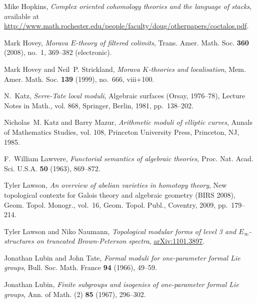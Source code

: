 \documentclass{gtpart}
\theoremstyle{definition}
\theoremstyle{remark}
\begin{document}
\begin{thebibliography}
Mike Hopkins, \emph{Complex oriented cohomology theories and the language of
  stacks}, available at
  \href{http://www.math.rochester.edu/people/faculty/doug/otherpapers/coctalos.pdf}{http://www.math.rochester.edu/people/faculty/doug/otherpapers/coctalos.pdf}.

Mark Hovey, \emph{Morava {$E$}-theory of filtered colimits}, Trans. Amer. Math.
  Soc. \textbf{360} (2008), no.~1, 369--382 (electronic). 

Mark Hovey and Neil~P. Strickland, \emph{Morava {$K$}-theories and
  localisation}, Mem. Amer. Math. Soc. \textbf{139} (1999), no.~666, viii+100.

N.~Katz, \emph{Serre-{T}ate local moduli}, Algebraic surfaces ({O}rsay,
  1976--78), Lecture Notes in Math., vol. 868, Springer, Berlin, 1981,
  pp.~138--202. 

Nicholas~M. Katz and Barry Mazur, \emph{Arithmetic moduli of elliptic curves},
  Annals of Mathematics Studies, vol. 108, Princeton University Press,
  Princeton, NJ, 1985. 

F.~William Lawvere, \emph{Functorial semantics of algebraic theories}, Proc.
  Nat. Acad. Sci. U.S.A. \textbf{50} (1963), 869--872. 

Tyler Lawson, \emph{An overview of abelian varieties in homotopy theory}, New
  topological contexts for {G}alois theory and algebraic geometry ({BIRS}
  2008), Geom. Topol. Monogr., vol.~16, Geom. Topol. Publ., Coventry, 2009,
  pp.~179--214. 

Tyler Lawson and Niko Naumann, \emph{Topological modular forms of level 3 and
  ${E}_\infty$-structures on truncated {B}rown-{P}eterson spectra},
  \href{http://arxiv.org/abs/1101.3897}{arXiv:1101.3897}.

Jonathan Lubin and John Tate, \emph{Formal moduli for one-parameter formal
  {L}ie groups}, Bull. Soc. Math. France \textbf{94} (1966), 49--59.

Jonathan Lubin, \emph{Finite subgroups and isogenies of one-parameter formal
  {L}ie groups}, Ann. of Math. (2) \textbf{85} (1967), 296--302. 


\end{thebibliography}
\end{document}

